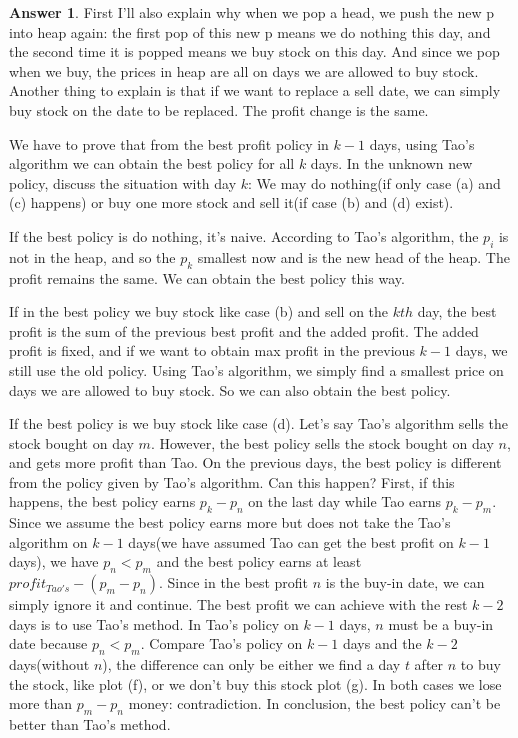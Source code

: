\documentclass{article}
\theoremstyle{definition}
\newtheorem{ans}{Answer}
\begin{document}
\begin{ans}
		First I'll also explain why when we pop a head, we push the new p into heap again: the first pop of this new p means we do nothing this day, and the second time it is popped means we buy stock on this day. And since we pop when we buy, the prices in heap are all on days we are allowed to buy stock. Another thing to explain is that if we want to replace a sell date, we can simply buy stock on the date to be replaced. The profit change is the same.
		
		We have to prove that from the best profit policy in $k-1$ days, using Tao's algorithm we can obtain the best policy for all $k$ days. In the unknown new policy, discuss the situation with day $k$: We may do nothing(if only case (a) and (c) happens) or buy one more stock and sell it(if case (b) and (d) exist). 
		
		If the best policy is do nothing, it's naive. According to Tao's algorithm, the $p_i$ is not in the heap, and so the $p_k$ smallest now and is the new head of the heap. The profit remains the same. We can obtain the best policy this way.
		
		If in the best policy we buy stock like case (b) and sell on the $kth$ day, the best profit is the sum of the previous best profit and the added profit. The added profit is fixed, and if we want to obtain max profit in the previous $k-1$ days, we still use the old policy. Using Tao's algorithm, we simply find a smallest price on days we are allowed to buy stock. So we can also obtain the best policy. 
		
		If the best policy is we buy stock like case (d). Let's say Tao's algorithm sells the stock bought on day $m$. However, the best policy sells the stock bought on day $n$, and gets more profit than Tao. On the previous days, the best policy is different from the policy given by Tao's algorithm. Can this happen? First, if this happens, the best policy earns $p_k-p_n$ on the last day while Tao earns $p_k-p_m$. Since we assume the best policy earns more but does not take the Tao's algorithm on $k-1$ days(we have assumed Tao can get the best profit on $k-1$ days), we have $p_n<p_m$ and the best policy earns at least $profit_{Tao's}-(p_m-p_n)$. Since in the best profit $n$ is the buy-in date, we can simply ignore it and continue. The best profit we can achieve with the rest $k-2$ days is to use Tao's method. In Tao's policy on $k-1$ days, $n$ must be a buy-in date because $p_n<p_m$. Compare Tao's policy on $k-1$ days and the $k-2$ days(without $n$), the difference can only be either we find a day $t$ after $n$ to buy the stock, like plot (f), or we don't buy this stock plot (g). In both cases we lose more than $p_m-p_n$ money: contradiction. In conclusion, the best policy can't be better than Tao's method.
		

\end{ans}
\end{document}
